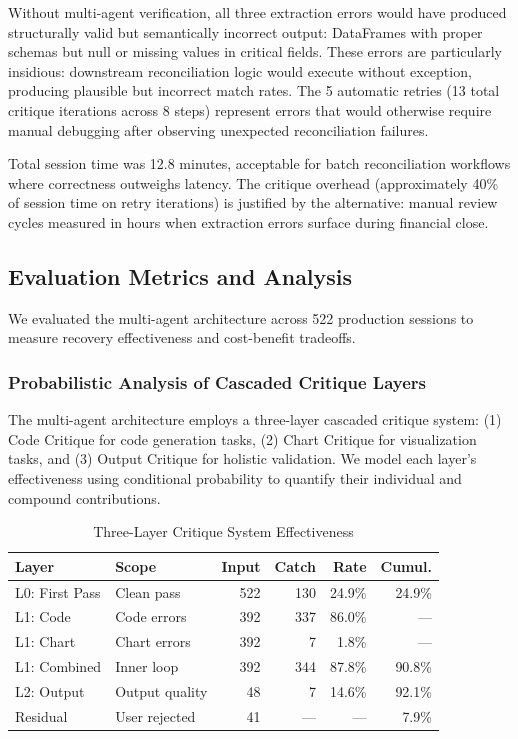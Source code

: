 \documentclass[sigconf]{acmart}
\begin{document}
Without multi-agent verification, all three extraction errors would have produced structurally valid but semantically incorrect output: DataFrames with proper schemas but null or missing values in critical fields. These errors are particularly insidious: downstream reconciliation logic would execute without exception, producing plausible but incorrect match rates. The 5 automatic retries (13 total critique iterations across 8 steps) represent errors that would otherwise require manual debugging after observing unexpected reconciliation failures.

Total session time was 12.8 minutes, acceptable for batch reconciliation workflows where correctness outweighs latency. The critique overhead (approximately 40\% of session time on retry iterations) is justified by the alternative: manual review cycles measured in hours when extraction errors surface during financial close.

\subsection{Evaluation Metrics and Analysis}
\label{sec:metrics}

We evaluated the multi-agent architecture across 522 production sessions to measure recovery effectiveness and cost-benefit tradeoffs.

\subsubsection{Probabilistic Analysis of Cascaded Critique Layers}

The multi-agent architecture employs a three-layer cascaded critique system: (1) Code Critique for code generation tasks, (2) Chart Critique for visualization tasks, and (3) Output Critique for holistic validation. We model each layer's effectiveness using conditional probability to quantify their individual and compound contributions.

\begin{table}[H]
\centering
\caption{Three-Layer Critique System Effectiveness}
\label{tab:critique-effectiveness}
\footnotesize
\begin{tabular}{@{}llrrrr@{}}
\toprule
\textbf{Layer} & \textbf{Scope} & \textbf{Input} & \textbf{Catch} & \textbf{Rate} & \textbf{Cumul.} \\
\midrule
L0: First Pass & Clean pass & 522 & 130 & 24.9\% & 24.9\% \\
L1: Code & Code errors & 392 & 337 & 86.0\% & --- \\
L1: Chart & Chart errors & 392 & 7 & 1.8\% & --- \\
L1: Combined & Inner loop & 392 & 344 & 87.8\% & 90.8\% \\
L2: Output & Output quality & 48 & 7 & 14.6\% & 92.1\% \\
Residual & User rejected & 41 & --- & --- & 7.9\% \\
\bottomrule
\end{tabular}
\end{table}
\end{document}
